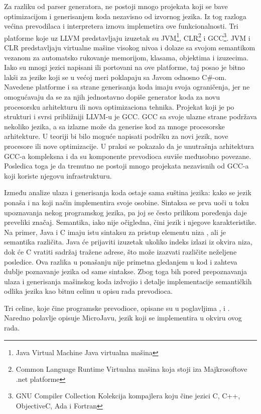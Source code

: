 Za razliku od parser generatora, ne postoji mnogo projekata koji se bave optimizacijom i generisanjem koda nezavisno od izvornog jezika.
Iz tog razloga većina prevodilaca i interpretera iznova implemetira ove funkcionalnosti. 
Tri platforme koje uz LLVM predstavljaju izuzetak su 
JVM\footnote{\skr \eng Java Virtual Machine \ndash Java virtualna mašina}, 
CLR\footnote{\skr \eng Common Language Runtime \ndash Virtualna mašina koja stoji iza Majkrosoftove .net platforme} 
i GCC\footnote{\skr \eng GNU Compiler Collection \ndash Kolekcija kompajlera koju čine jezici C, C++, ObjectiveC, Ada i Fortran}. 
JVM i CLR predstavljaju virtualne mašine visokog nivoa i dolaze sa svojom semantikom vezanom za automatsko rukovanje memorijom, klasama, objektima i izuzecima. 
Iako su mnogi jezici napisani ili portovani na ove platforme, taj posao je bitno lakši za jezike koji se u većoj meri poklapaju sa Javom odnosno C\#-om. 
Navedene platforme i sa strane generisanja koda imaju svoja ograničenja, jer ne omogućavaju da se za njih jednostavno dopiše generator koda za novu procesorsku arhitekturu ili nova optimizaciona tehnika. 
Projekat koji je po strukturi i svrsi približniji LLVM-u je GCC.
GCC sa svoje ulazne strane podržava nekoliko jezika, a sa izlazne može da generise kod za mnoge procesorske arhitekture.
U teoriji bi bilo moguće napisati podršku za novi jezik, nove procesore ili nove optimizacije.
U praksi se pokazalo da je unutrašnja arhitektura GCC-a kompleksna i da su komponente prevodioca suviše međusobno povezane. 
Posledica toga je da trenutno ne postoji mnogo projekata nezavisnih od GCC-a koji koriste njegovu infrastrukturu.

Između analize ulaza i generisanja koda ostaje sama suština jezika: kako se jezik ponaša i na koji način implementira svoje osobine.
Sintaksa se prva uoči u toku upoznavanja nekog programskog jezika, pa joj se često prilikom poređenja daje preveliki značaj.
Semantika, iako nije očigledna, čini jezik i njegove karakteristike.
Na primer, Java i C imaju istu sintaksu za pristup elementu niza \ndash {}, ali je semantika različita.
Java će prijaviti izuzetak ukoliko indeks izlazi iz okvira niza, dok će C vratiti sadržaj tražene adrese, što može izazvati različite neželjene posledice.
Ova razlika u ponašanju nije primetna gledanjem u kod i zahteva dublje poznavanje jezika od same sintakse.
Zbog toga bih pored prepoznavanja ulaza i generisanja mašinskog koda izdvojio i detalje implementacije semantičkih odlika jezika kao bitnu celinu u opisu rada prevodioca.

Tri celine, koje čine programske prevodioce, opisane su u poglavljima ,  i .
Naredno polavlje opisuje MicroJavu, jezik koji se implementira u okviru ovog rada.
